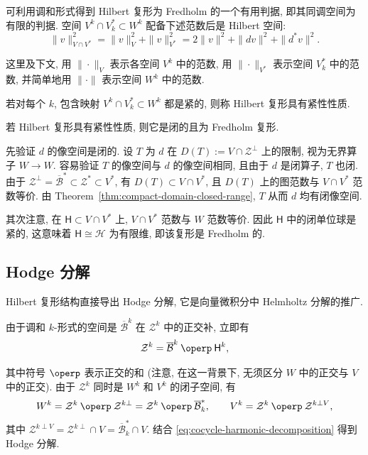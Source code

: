 可利用调和形式得到 Hilbert 复形为 Fredholm 的一个有用判据, 即其同调空间为有限的判据. 空间 $V^k\cap V_k^*\subset W^k$ 配备下述范数后是 Hilbert 空间:
\[
\|v\|_{V\cap V^*}^2=\|v\|_V^2+\|v\|_{V^*}^2=2\|v\|^2+\|dv\|^2+\|d^*v\|^2.
\]

这里及下文, 用 $\|\cdot\|_V$ 表示各空间 $V^k$ 中的范数, 用 $\|\cdot\|_{V^*}$ 表示空间 $V_k^*$ 中的范数, 并简单地用 $\|\cdot\|$ 表示空间 $W^k$ 中的范数.

\begin{Definition}\label{def:hilbert-complex-compactness-property}
若对每个 $k$, 包含映射 $V^k\cap V_k^*\subset W^k$ 都是紧的, 则称 Hilbert 复形具有紧性性质.
\end{Definition}

\begin{Theorem}\label{thm:compactness-implies-fredholm}
若 Hilbert 复形具有紧性性质, 则它是闭的且为 Fredholm 复形.
\end{Theorem}

\begin{Proof}
先验证 $d$ 的像空间是闭的. 设 $T$ 为 $d$ 在 $D(T):=V\cap\mathcal Z^\perp$ 上的限制, 视为无界算子 $W\to W$. 容易验证 $T$ 的像空间与 $d$ 的像空间相同, 且由于 $d$ 是闭算子, $T$ 也闭. 由于 $\mathcal Z^\perp=\overline{\mathcal B}^*\subset\mathcal Z^*\subset V^*$, 有 $D(T)\subset V\cap V^*$, 且 $D(T)$ 上的图范数与 $V\cap V^*$ 范数等价. 由 Theorem~\ref{thm:compact-domain-closed-range}, $T$ 从而 $d$ 均有闭像空间.

其次注意, 在 $\mathsf H\subset V\cap V^*$ 上, $V\cap V^*$ 范数与 $W$ 范数等价. 因此 $\mathsf H$ 中的闭单位球是紧的, 这意味着 $\mathsf H\cong\mathcal H$ 为有限维, 即该复形是 Fredholm 的.
\end{Proof}

\subsection{Hodge 分解}\label{subsec:hodge-decomposition}

Hilbert 复形结构直接导出 Hodge 分解, 它是向量微积分中 Helmholtz 分解的推广.

由于调和 $k$-形式的空间是 $\overline{\mathcal B}^k$ 在 $\mathcal Z^k$ 中的正交补, 立即有
\begin{equation}\label{eq:cocycle-harmonic-decomposition}
\mathcal Z^k=\overline{\mathcal B}^k\BookOrthSum\mathsf H^k,
\end{equation}

其中符号 $\BookOrthSum$ 表示正交的和 (注意, 在这一背景下, 无须区分 $W$ 中的正交与 $V$ 中的正交). 由于 $\mathcal Z^k$ 同时是 $W^k$ 和 $V^k$ 的闭子空间, 有
\[
W^k=\mathcal Z^k\BookOrthSum\mathcal Z^{k\perp}=\mathcal Z^k\BookOrthSum\overline{\mathcal B}_k^*,\qquad V^k=\mathcal Z^k\BookOrthSum\mathcal Z^{k\perp V},
\]
其中 $\mathcal Z^{k\perp V}=\mathcal Z^{k\perp}\cap V=\overline{\mathcal B}_k^*\cap V$. 结合 \eqref{eq:cocycle-harmonic-decomposition} 得到 Hodge 分解.

